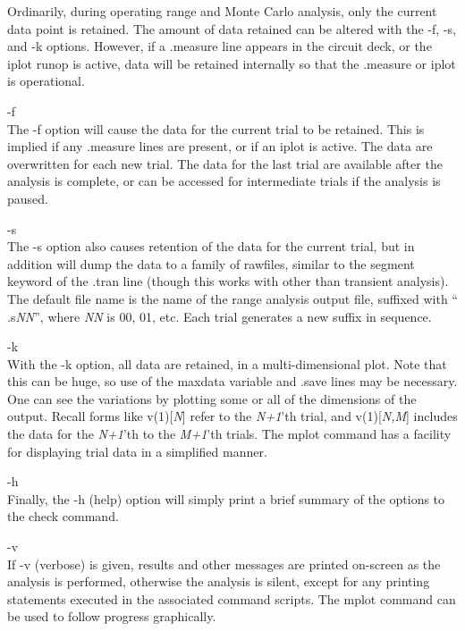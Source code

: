 Ordinarily, during operating range and Monte Carlo analysis, only the
current data point is retained.  The amount of data retained can be
altered with the {\vt -f}, {\vt -s}, and {\vt -k} options.  However,
if a {\vt .measure} line appears in the circuit deck, or the {\cb
iplot} runop is active, data will be retained internally so that the
{\vt .measure} or {\cb iplot} is operational.

\begin{description}
\item{\vt -f}\\
The {\vt -f} option will cause the data for the current trial to be
retained.  This is implied if any {\vt .measure} lines are present, or
if an {\cb iplot} is active.  The data are overwritten for each new
trial.  The data for the last trial are available after the analysis
is complete, or can be accessed for intermediate trials if the
analysis is paused.

\item{\vt -s}\\
The {\vt -s} option also causes retention of the data for the current
trial, but in addition will dump the data to a family of rawfiles,
similar to the {\vt segment} keyword of the {\vt .tran} line (though
this works with other than transient analysis).  The default file name
is the name of the range analysis output file, suffixed with ``{\vt
.s}{\it NN\/}'', where {\it NN} is 00, 01, etc.  Each trial generates
a new suffix in sequence.

\item{\vt -k}\\
With the {\vt -k} option, all data are retained, in a
multi-dimensional plot.  Note that this can be huge, so use of the
{\et maxdata} variable and {\vt .save} lines may be necessary.  One
can see the variations by plotting some or all of the dimensions of
the output.  Recall forms like {\vt v(1)[{\it N\/}]} refer to the {\it
N+1\/}'th trial, and {\vt v(1)[{\it N,M\/}]} includes the data for the
{\it N+1\/}'th to the {\it M+1\/}'th trials.  The {\et mplot} command
has a facility for displaying trial data in a simplified manner.

\item{\vt -h}\\
Finally, the {\vt -h} (help) option will simply print a brief summary
of the options to the {\cb check} command.

\item{\vt -v}\\
If {\vt -v} (verbose) is given, results and other messages are printed
on-screen as the analysis is performed, otherwise the analysis is
silent, except for any printing statements executed in the associated
command scripts.  The {\cb mplot} command can be used to follow
progress graphically.
\end{description}

